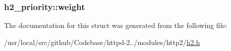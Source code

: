 \subsubsection[{\texorpdfstring{weight}{weight}}]{ h2\+\_\+priority\+::weight}\hypertarget{structh2__priority_a3501a5e9d3cff58e1b18760fa100b1c3}{}\label{structh2__priority_a3501a5e9d3cff58e1b18760fa100b1c3}


The documentation for this struct was generated from the following file\+:\begin{DoxyCompactItemize}
\item 
/usr/local/src/github/\+Codebase/httpd-\/2../modules/http2/\hyperlink{h2_8h}{h2.\+h}\end{DoxyCompactItemize}
